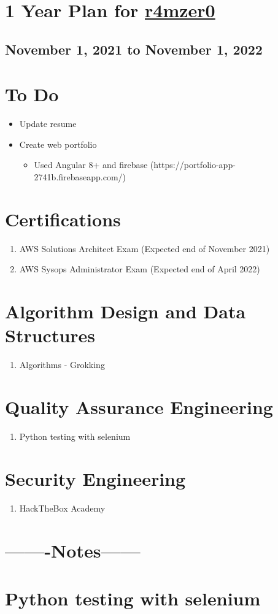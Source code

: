\documentclass[12pt,letterpaper]{article}
\begin{document}
\section*{1 Year Plan for \color{blue}\href{https://github.com/r4mz3r0}{r4mzer0} \color{black}}
\subsection{November 1, 2021 to November 1, 2022}
\section{To Do}
\begin{itemize}
    \item Update resume 
    \item Create web portfolio
    \begin{itemize}
        \item Used Angular 8+ and firebase (https://portfolio-app-2741b.firebaseapp.com/)
    \end{itemize} 
\end{itemize}
\section{Certifications} 
\begin{enumerate}
    \item AWS Solutions Architect Exam (Expected end of November 2021)
    \item AWS Sysops Administrator Exam (Expected end of April 2022) 
    
\end{enumerate}
\section{Algorithm Design and Data Structures}
\begin{enumerate}
    \item Algorithms - Grokking 
\end{enumerate}
\section{Quality Assurance Engineering} 
\begin{enumerate}
    \item Python testing with selenium
\end{enumerate}
\section{Security Engineering}
\begin{enumerate}
    \item HackTheBox Academy
\end{enumerate}

\section{-------Notes------}
\section{Python testing with selenium}
\end{document}
